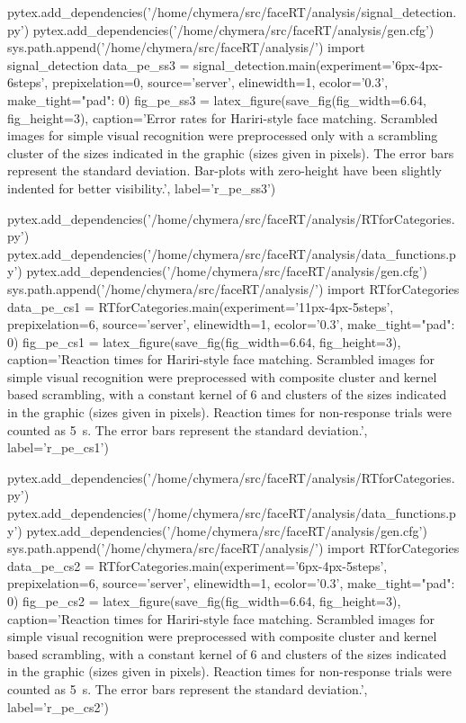 \begin{pycode}[pe_ss3]
pytex.add_dependencies('/home/chymera/src/faceRT/analysis/signal_detection.py')
pytex.add_dependencies('/home/chymera/src/faceRT/analysis/gen.cfg')
sys.path.append('/home/chymera/src/faceRT/analysis/')
import signal_detection
data_pe_ss3 = signal_detection.main(experiment='6px-4px-6steps', prepixelation=0, source='server', elinewidth=1, ecolor='0.3', make_tight={"pad": 0})
fig_pe_ss3 = latex_figure(save_fig(fig_width=6.64, fig_height=3), caption='Error rates for Hariri-style face matching. Scrambled images for simple visual recognition were preprocessed only with a scrambling cluster of the sizes indicated in the graphic (sizes given in pixels). The error bars represent the standard deviation. Bar-plots with zero-height have been slightly indented for better visibility.', label='r_pe_ss3')
\end{pycode}
\begin{pycode}
pytex.add_dependencies('/home/chymera/src/faceRT/analysis/RTforCategories.py')
pytex.add_dependencies('/home/chymera/src/faceRT/analysis/data_functions.py')
pytex.add_dependencies('/home/chymera/src/faceRT/analysis/gen.cfg')
sys.path.append('/home/chymera/src/faceRT/analysis/')
import RTforCategories
data_pe_cs1 = RTforCategories.main(experiment='11px-4px-5steps', prepixelation=6, source='server', elinewidth=1, ecolor='0.3', make_tight={"pad": 0})
fig_pe_cs1 = latex_figure(save_fig(fig_width=6.64, fig_height=3), caption='Reaction times for Hariri-style face matching. Scrambled images for simple visual recognition were preprocessed with composite cluster and kernel based scrambling, with a constant kernel of \SI{6}{\pixel} and clusters of the sizes indicated in the graphic (sizes given in pixels). Reaction times for non-response trials were counted as \SI{5}{\second}. The error bars represent the standard deviation.', label='r_pe_cs1')
\end{pycode}
\begin{pycode}
pytex.add_dependencies('/home/chymera/src/faceRT/analysis/RTforCategories.py')
pytex.add_dependencies('/home/chymera/src/faceRT/analysis/data_functions.py')
pytex.add_dependencies('/home/chymera/src/faceRT/analysis/gen.cfg')
sys.path.append('/home/chymera/src/faceRT/analysis/')
import RTforCategories
data_pe_cs2 = RTforCategories.main(experiment='6px-4px-5steps', prepixelation=6, source='server', elinewidth=1, ecolor='0.3', make_tight={"pad": 0})
fig_pe_cs2 = latex_figure(save_fig(fig_width=6.64, fig_height=3), caption='Reaction times for Hariri-style face matching. Scrambled images for simple visual recognition were preprocessed with composite cluster and kernel based scrambling, with a constant kernel of \SI{6}{\pixel} and clusters of the sizes indicated in the graphic (sizes given in pixels). Reaction times for non-response trials were counted as \SI{5}{\second}. The error bars represent the standard deviation.', label='r_pe_cs2')
\end{pycode}
